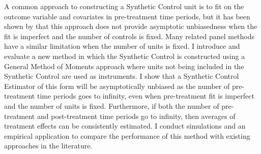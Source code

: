 A common approach to constructing a Synthetic Control unit is to fit on the outcome variable and covariates in pre-treatment time periods, but it has been shown by \cite{ImperfectFit} that this approach does not provide asymptotic unbiasedness when the fit is imperfect and the number of controls is fixed. Many related panel methods have a similar limitation when the number of units is fixed. I introduce and evaluate a new method in which the Synthetic Control is constructed using a General Method of Moments approach where units not being included in the Synthetic Control are used as instruments. I show that a Synthetic Control Estimator of this form will be asymptotically unbiased as the number of pre-treatment time periods goes to infinity, even when pre-treatment fit is imperfect and the number of units is fixed. Furthermore, if both the number of pre-treatment and post-treatment time periods go to infinity, then averages of treatment effects can be consistently estimated. I conduct simulations and an empirical application to compare the performance of this method with existing approaches in the literature.